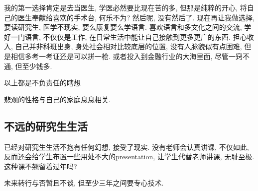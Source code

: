 \documentclass[a4paper, UTF8,  12pt]{article}
\begin{document}
我的第一选择肯定是去当医生, 学医必然要比现在苦的多, 但那是纯粹的开心, 将自己的医生奉献给喜欢的手术台, 何乐不为? 然后呢, 没有然后了. 现在再让我做选择, 要读研究生, 医学不现实, 要么康复要么学语言. 喜欢语言和多文化之间的交流, 学好一门语言, 不仅仅是工作, 在日常生活中能让自己接触到更多更广的东西. 担心收入, 自己并非科班出身, 身处社会相对比较底层的位置, 没有人脉貌似有点困难, 但是相信多考一考证还是可以拼一枪. 或者投入到金融行业的大海里面, 尽管一窍不通, 但至少钱多.

以上都是不负责任的瞎想

悲观的性格与自己的家庭息息相关.

\subsection{不远的研究生生活}

已经对研究生生活不抱有任何幻想, 接受了现实. 没有老师会认真讲课, 不仅如此, 反而还会给学生布置一些用处不大的presentation, 让学生代替老师讲课, 无耻至极. 这种课不翘留着过年吗?

未来转行与否暂且不谈, 但至少三年之间要专心技术.
\end{document}
